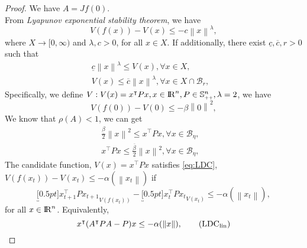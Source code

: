 \documentclass[a4paper,11pt,reqno]{amsart}
\newcommand{\R}{{\rm I\!R}}
\newcommand{\tran}{\intercal}
\newcommand{\smallplus}{{\scriptscriptstyle +}}
\newcommand{\Spp}{\mathbb{S}_{\smallplus\smallplus}}
\begin{document}
\begin{proof}
We have $A=Jf(0)$. 
\\
From \emph{Lyapunov exponential stability theorem}, we have
\begin{equation}
    V(f(x))-V(x)\leq-c\left\lVert x\right\rVert^{\lambda},\tag{LDC}
    \label{eq:LDC}
\end{equation}
where $X\rightarrow [0,\infty)$ and $\lambda,c>0$, for all $x\in X$. If additionally, there exist $\underline{c}, \overline{c}, r > 0$ such that
\begin{align}
    \underline{c}\left\lVert x\right\rVert^{\lambda}\leq V(x), \forall x\in X,\tag{GLB}&
    \label{eq:GLB}
    \\
    V(x)\leq\overline{c}\left\lVert x\right\rVert^{\lambda}, \forall x\in X\cap\mathcal{B}_r,\tag{LUB}&
    \label{eq:LUB}
\end{align}
Specifically, we define $V: V(x)=x^{\tran}Px, x\in\R^n, P\in\Spp^n, \lambda=2$, we have
\begin{equation}
    V(f(0))-V(0)\leq-\beta\left\lVert 0\right\rVert^{2},
\end{equation}
We know that $\rho(A)<1$, we can get
\begin{align}
    \tfrac{\underline{\beta}}{2}\left\lVert x\right\rVert^{2}\leq x^{\tran}Px, \forall x\in \mathcal{B}_{\eta},&
    \\
    x^{\tran}Px\leq\tfrac{\overline{\beta}}{2}\left\lVert x\right\rVert^{2}, \forall x\in\mathcal{B}_{\eta},&
\end{align}
The candidate function, $V(x)=x^{\tran}Px$ satisfies \eqref{eq:LDC}, $V(f(x_t))-V(x_t)\leq-\alpha(\left\lVert x_t\right\rVert)$ if
\begin{equation}
    \underbracket[0.5pt]{x_{t+1}^{\tran}Px_{t+1}}_{V(f(x_t))}-\underbracket[0.5pt]{x_t^{\tran}Px_t}_{V(x_t)}\leq-\alpha(\left\lVert x_t\right\rVert),
\end{equation}
for all $x\in\R^n$.
Equivalently,
\begin{equation}
    x^{\tran}(A^{\tran}PA-P)x\leq-\alpha(\left\lVert x\right\rVert), \tag{LDC$_{\mathrm{lin}}$}
    \label{eq:LDC_lin}
\end{equation}

\end{proof}
\end{document}
